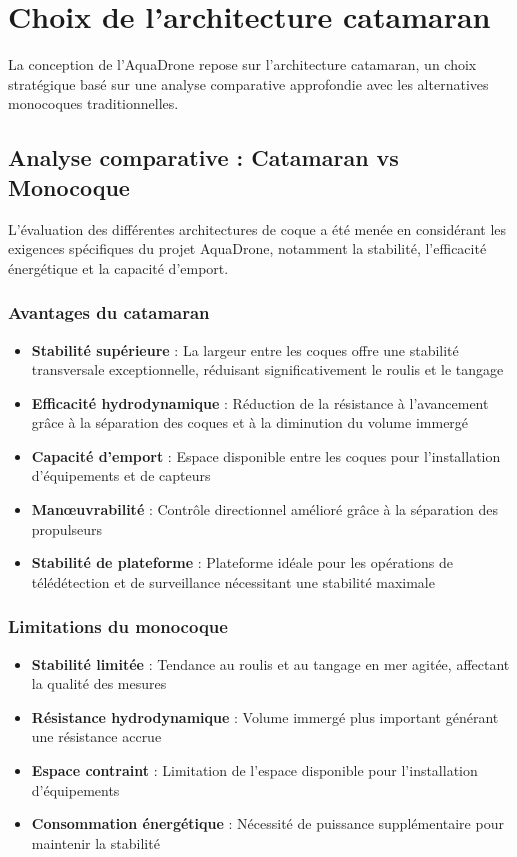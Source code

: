 {\section{Choix de l'architecture catamaran}
La conception de l'AquaDrone repose sur l'architecture catamaran, un choix stratégique basé sur une analyse comparative approfondie avec les alternatives monocoques traditionnelles.

\subsection{Analyse comparative : Catamaran vs Monocoque}
L'évaluation des différentes architectures de coque a été menée en considérant les exigences spécifiques du projet AquaDrone, notamment la stabilité, l'efficacité énergétique et la capacité d'emport.

\subsubsection{Avantages du catamaran}
\begin{itemize}
    \item \textbf{Stabilité supérieure} : La largeur entre les coques offre une stabilité transversale exceptionnelle, réduisant significativement le roulis et le tangage
    \item \textbf{Efficacité hydrodynamique} : Réduction de la résistance à l'avancement grâce à la séparation des coques et à la diminution du volume immergé
    \item \textbf{Capacité d'emport} : Espace disponible entre les coques pour l'installation d'équipements et de capteurs
    \item \textbf{Manœuvrabilité} : Contrôle directionnel amélioré grâce à la séparation des propulseurs
    \item \textbf{Stabilité de plateforme} : Plateforme idéale pour les opérations de télédétection et de surveillance nécessitant une stabilité maximale
\end{itemize}

\subsubsection{Limitations du monocoque}
\begin{itemize}
    \item \textbf{Stabilité limitée} : Tendance au roulis et au tangage en mer agitée, affectant la qualité des mesures
    \item \textbf{Résistance hydrodynamique} : Volume immergé plus important générant une résistance accrue
    \item \textbf{Espace contraint} : Limitation de l'espace disponible pour l'installation d'équipements
    \item \textbf{Consommation énergétique} : Nécessité de puissance supplémentaire pour maintenir la stabilité
\end{itemize}

}

